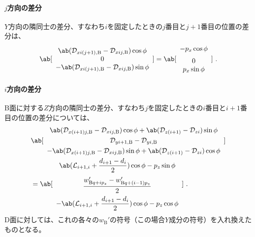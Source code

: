 \clearpage
\paragraph*{$j$方向の差分}\noindent
$Y$方向の隣同士の差分、すなわち$i$を固定したときの$j$番目と$j+1$番目の位置の差分は、
\begin{align*}
  \ab[
  \begin{array}{c}
    \ab(\mathcal D_{xi(j+1),\mathrm B}-\mathcal D_{xij,\mathrm B})\cos\phi\\
    0\\
    -\ab(\mathcal D_{xi(j+1),\mathrm B}-\mathcal D_{xij,\mathrm B})\sin\phi
  \end{array}
  ]
  = \ab[
    \begin{array}{c}
      -p_x\cos\phi\\[6pt]
      0\\
      p_x\sin\phi
    \end{array}
    ]\ .
\end{align*}

\paragraph*{$i$方向の差分}\noindent
B面に対する$Z$方向の隣同士の差分、すなわち$j$を固定したときの$i$番目と$i+1$番目の位置の差分については、
\begin{align*}
 &\ab[
  \begin{array}{c}
    \ab(\mathcal D_{x(i+1)j,\mathrm B}-\mathcal D_{xij,\mathrm B})\cos\phi
    +\ab(\mathcal D_{z(i+1)}-\mathcal D_{zi})\sin\phi\\[3pt]
    \mathcal D_{yi+1,\mathrm B}-\mathcal D_{yi,\mathrm B}\\[3pt]
    -\ab(\mathcal D_{x(i+1)j,\mathrm B}-\mathcal D_{xij,\mathrm B})\sin\phi
    +\ab(\mathcal D_{z(i+1)}-\mathcal D_{zi})\cos\phi
  \end{array}
  ]\\
 &= \ab[
    \begin{array}{c}
      \displaystyle\ab(\mathcal L_{i+1, i}+\frac{d_{i+1}-d_i}2)\cos\phi-p_z\sin\phi\\[10pt]
      \displaystyle\frac{w'_{\mathrm Bq+ip_z}-w'_{\mathrm Bq+(i-1)p_z}}2\\[8pt]
      \displaystyle-\ab(\mathcal L_{i+1, i}+\frac{d_{i+1}-d_i}2)\cos\phi-p_z\cos\phi
    \end{array}
    ]\ .
\end{align*}
D面に対しては、これの各々の\InnerDiameter$w_\mathrm B'$の符号（この場合$Y$成分の符号）を入れ換えたものとなる。
